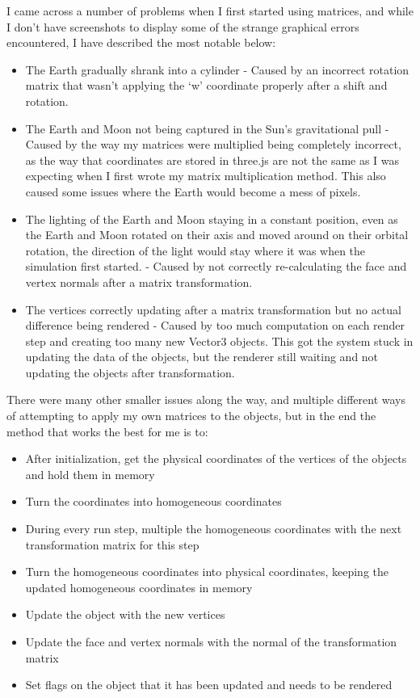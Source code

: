 \documentclass[12pt]{article}
\begin{document}
I came across a number of problems when I first started using matrices, and while I don't have screenshots to display some of the strange graphical errors encountered, I have described the most notable below:
\begin{itemize}
 \item The Earth gradually shrank into a cylinder - Caused by an incorrect rotation matrix that wasn't applying the `w' coordinate properly after a shift and rotation.
 \item The Earth and Moon not being captured in the Sun's gravitational pull - Caused by the way my matrices were multiplied being completely incorrect, as the way that coordinates are stored in three.js are not the same as I was expecting when I first wrote my matrix multiplication method. This also caused some issues where the Earth would become a mess of pixels.
 \item The lighting of the Earth and Moon staying in a constant position, even as the Earth and Moon rotated on their axis and moved around on their orbital rotation, the direction of the light would stay where it was when the simulation first started. - Caused by not correctly re-calculating the face and vertex normals after a matrix transformation.
 \item The vertices correctly updating after a matrix transformation but no actual difference being rendered - Caused by too much computation on each render step and creating too many new Vector3 objects. This got the system stuck in updating the data of the objects, but the renderer still waiting and not updating the objects after transformation.
\end{itemize}

There were many other smaller issues along the way, and multiple different ways of attempting to apply my own matrices to the objects, but in the end the method that works the best for me is to:
\begin{itemize}
\item After initialization, get the physical coordinates of the vertices of the objects and hold them in memory
\item Turn the coordinates into homogeneous coordinates
\item During every run step, multiple the homogeneous coordinates with the next transformation matrix for this step
\item Turn the homogeneous coordinates into physical coordinates, keeping the updated homogeneous coordinates in memory
\item Update the object with the new vertices
\item Update the face and vertex normals with the normal of the transformation matrix
\item Set flags on the object that it has been updated and needs to be rendered
\end{itemize}
\end{document}
